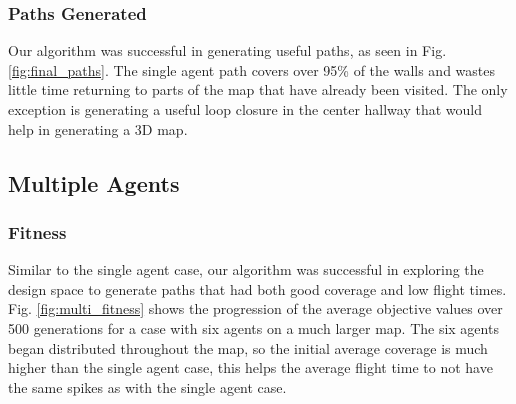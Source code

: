 \documentclass[letterpaper, 10 pt, conference]{ieeeconf}  %
\begin{document}
\subsubsection{Paths Generated}
Our algorithm was successful in generating useful paths, as seen in Fig. \ref{fig:final_paths}. The single agent path covers over 95\% of the walls and wastes little time returning to parts of the map that have already been visited. The only exception is generating a useful loop closure in the center hallway that would help in generating a 3D map.

\subsection{Multiple Agents}
\subsubsection{Fitness}
Similar to the single agent case, our algorithm was successful in exploring the design space to generate paths that had both good coverage and low flight times. Fig. \ref{fig:multi_fitness} shows the progression of the average objective values over 500 generations for a case with six agents on a much larger map. The six agents began distributed throughout the map, so the initial average coverage is much higher than the single agent case, this helps the average flight time to not have the same spikes as with the single agent case.
\end{document}
